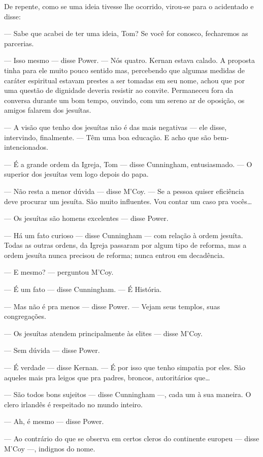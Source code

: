 De repente, como se uma ideia tivesse lhe ocorrido, virou-se para o
acidentado e disse:

--- Sabe que acabei de ter uma ideia, Tom? Se você for conosco,
fecharemos as parcerias.

--- Isso mesmo --- disse Power. --- Nós quatro. Kernan estava
calado. A proposta tinha para ele muito pouco sentido mas, percebendo
que algumas medidas de caráter espiritual estavam prestes a ser
tomadas em seu nome, achou que por uma questão de dignidade deveria
resistir ao convite. Permaneceu fora da conversa durante um bom
tempo, ouvindo, com um sereno ar de oposição, os amigos falarem
dos jesuítas.

--- A visão que tenho dos jesuítas não é das mais negativas --- ele
disse, intervindo, finalmente. --- Têm uma boa educação. E acho que
são bem-intencionados.

--- É a grande ordem da Igreja, Tom --- disse Cunningham,
entusiasmado. --- O superior dos jesuítas vem logo depois do papa.

--- Não resta a menor dúvida --- disse M'Coy. --- Se a pessoa quiser
eficiência deve procurar um jesuíta. São muito influentes. Vou contar
um caso pra vocês\ldots{}

--- Os jesuítas são homens excelentes --- disse Power.

--- Há um fato curioso --- disse Cunningham --- com relação à ordem
jesuíta. Todas as outras ordens, da Igreja passaram por algum tipo de
reforma, mas a ordem jesuíta nunca precisou de reforma; nunca entrou
em decadência.

--- E mesmo? --- perguntou M'Coy.

--- É um fato --- disse Cunningham. --- É História.

--- Mas não é pra menos --- disse Power. --- Vejam seus templos,
suas congregações.

--- Os jesuítas atendem principalmente às elites --- disse M'Coy.

--- Sem dúvida --- disse Power.

--- É verdade --- disse Kernan. --- É por isso que tenho simpatia por
eles. São aqueles mais pra leigos que pra padres, broncos,
autoritários que\ldots{}

--- São todos bons sujeitos --- disse Cunningham ---, cada um à sua
maneira. O clero irlandês é respeitado no mundo inteiro.

--- Ah, é mesmo --- disse Power.

--- Ao contrário do que se observa em certos cleros do continente
europeu --- disse M'Coy ---, indignos do nome.

